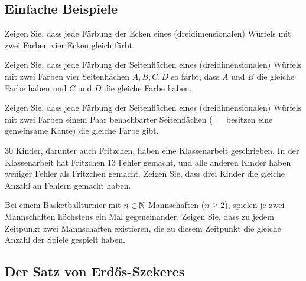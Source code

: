 \subsection{Einfache Beispiele} 

\begin{aufg}
	Zeigen Sie, dass jede Färbung der Ecken eines (dreidimensionalen) Würfels mit zwei Farben vier Ecken gleich färbt. 
\end{aufg}

\begin{aufg}
Zeigen Sie, dass jede Färbung der Seitenflächen eines (dreidimensionalen) Würfels mit zwei Farben vier Seitenflächen $A, B, C, D$ so färbt, dass $A$ und $B$ die gleiche Farbe haben und $C$ und $D$ die gleiche Farbe haben.
\end{aufg}

\begin{aufg}
	Zeigen Sie, dass jede Färbung der Seitenflächen eines (dreidimensionalen) Würfels mit zwei Farben einem Paar benachbarter Seitenflächen ($=$ besitzen eine gemeinsame Kante) die gleiche Farbe gibt.
\end{aufg}

\begin{aufg}
	$30$ Kinder, darunter auch Fritzchen, haben eine Klassenarbeit geschrieben. In der Klassenarbeit hat Fritzchen $13$ Fehler gemacht, und alle anderen Kinder haben weniger Fehler als Fritzchen gemacht. Zeigen Sie, dass drei Kinder die gleiche Anzahl an Fehlern gemacht haben. 
\end{aufg}  

\begin{aufg}
	Bei einem Basketballturnier mit $n \in \mathbb{N}$ Mannschaften ($n \ge 2$), spielen je zwei Mannschaften höchstens ein Mal gegeneinander. Zeigen Sie, dass zu jedem Zeitpunkt zwei Mannschaften existieren, die zu diesem Zeitpunkt die gleiche Anzahl der Spiele gespielt haben. 
\end{aufg} 

\subsection{Der Satz von Erd\H{os}-Szekeres}


